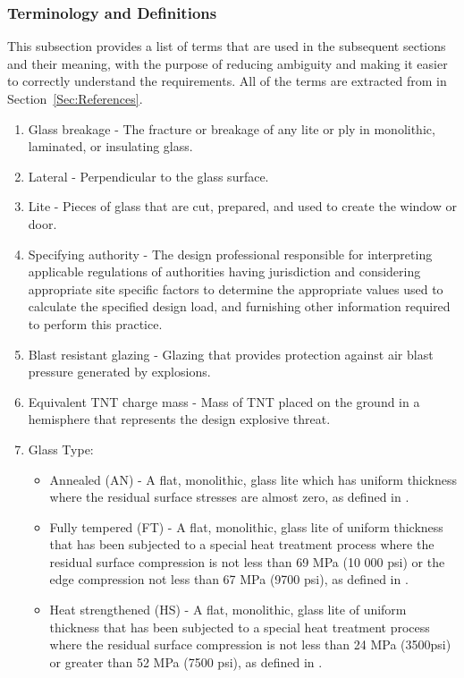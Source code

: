 \documentclass[12pt]{article}
\begin{document}
\subsubsection{Terminology and Definitions}
\label{Sec:TermDefs}
This subsection provides a list of terms that are used in the subsequent sections and their meaning, with the purpose of reducing ambiguity and making it easier to correctly understand the requirements. All of the terms are extracted from \cite{astm2009} in Section~\ref{Sec:References}.
\begin{enumerate}
\item{Glass breakage - The fracture or breakage of any lite or ply in monolithic, laminated, or insulating glass.}
\item{Lateral - Perpendicular to the glass surface.}
\item{Lite - Pieces of glass that are cut, prepared, and used to create the window or door.}
\item{Specifying authority - The design professional responsible for interpreting applicable regulations of authorities having jurisdiction and considering appropriate site specific factors to determine the appropriate values used to calculate the specified design load, and furnishing other information required to perform this practice.}
\item{Blast resistant glazing - Glazing that provides protection against air blast pressure generated by explosions.}
\item{Equivalent TNT charge mass - Mass of TNT placed on the ground in a hemisphere that represents the design explosive threat.}
\item{Glass Type:}
\begin{itemize}
\item{Annealed (AN) - A flat, monolithic, glass lite which has uniform thickness where the residual surface stresses are almost zero, as defined in \cite{astm2016}.}
\item{Fully tempered (FT) - A flat, monolithic, glass lite of uniform thickness that has been subjected to a special heat treatment process where the residual surface compression is not less than 69 MPa (10 000 psi) or the edge compression not less than 67 MPa (9700 psi), as defined in \cite{astm2012}.}
\item{Heat strengthened (HS) - A flat, monolithic, glass lite of uniform thickness that has been subjected to a special heat treatment process where the residual surface compression is not less than 24 MPa (3500psi) or greater than 52 MPa (7500 psi), as defined in \cite{astm2012}.}

\end{itemize}
\end{enumerate}
\end{document}
